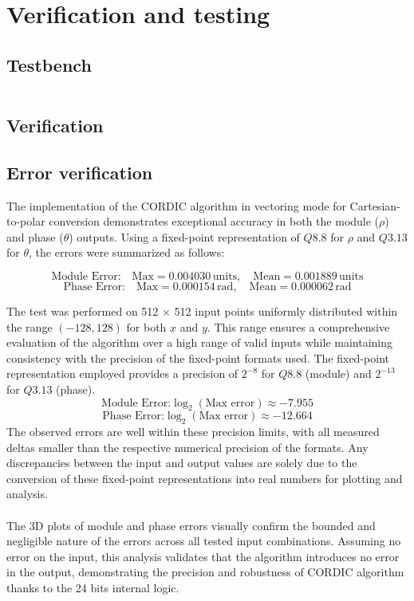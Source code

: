 \chapter{Verification and testing}

\section{Testbench}



\begin{code}
    \inputminted{vhdl}{listings/04/CORDIC_tb.vhd}
    \label{code:testbench}
\end{code}

\section{Verification}

\section{Error verification}
The implementation of the CORDIC algorithm in vectoring mode for Cartesian-to-polar conversion demonstrates 
exceptional accuracy in both the module (\( \rho \)) and phase (\( \theta \)) outputs. Using a fixed-point 
representation of \( Q8.8 \) for \( \rho \) and \( Q3.13 \) for \( \theta \), the errors were summarized as follows:

\[
\text{Module Error:} \quad \text{Max} = 0.004030 \, \text{units}, \quad \text{Mean} = 0.001889 \, \text{units}
\]
\[
\text{Phase Error:} \quad \text{Max} = 0.000154 \, \text{rad}, \quad \text{Mean} = 0.000062 \, \text{rad}
\]

The test was performed on 512 × 512 input points uniformly distributed within the range \( (-128, 128) \) for both \( x \) and \( y \).
This range ensures a comprehensive evaluation of the algorithm over a high range of valid inputs while maintaining 
consistency with the precision of the fixed-point formats used. The fixed-point representation employed provides a precision 
of \( 2^{-8} \) for \( Q8.8 \) (module) and \( 2^{-13} \) for \( Q3.13 \) (phase). 
\[
    \text{Module Error:} \log_2(\text{Max error}) \approx -7.955
\]
\[
    \text{Phase Error:} \log_2(\text{Max error}) \approx -12.664
\]
The observed errors are well within these precision limits, with all measured deltas smaller than the respective numerical precision of the formats. Any discrepancies between the input and output values are solely due to the conversion of these fixed-point representations into real numbers for plotting and analysis. 
\\\\
The 3D plots of module and phase errors visually confirm the bounded and negligible nature of the errors across 
all tested input combinations. Assuming no error on the input, this analysis validates that the algorithm introduces 
no error in the output, demonstrating the precision and robustness of CORDIC algorithm thanks to the 24 bits internal logic.

